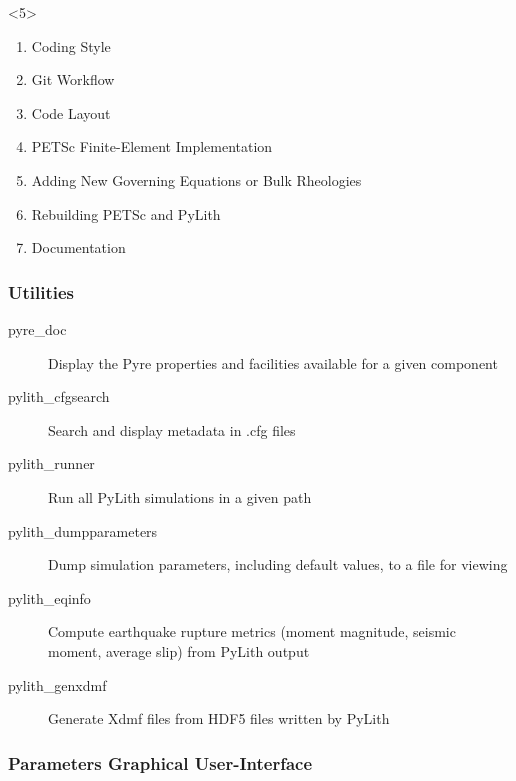 \documentclass[aspectratio=169]{beamer}
\begin{document}
\begin{frame}[t]
\begin{itemize}
\begin{onlyenv}
\begin{itemize}
      \end{itemize}
    \end{onlyenv}
    \begin{onlyenv}<5>
      \begin{enumerate}
      \item Coding Style
      \item Git Workflow
      \item Code Layout
      \item PETSc Finite-Element Implementation
      \item Adding New Governing Equations or Bulk Rheologies
      \item Rebuilding PETSc and PyLith
      \item Documentation
      \end{enumerate}
    \end{onlyenv}
  \end{itemize}

\end{frame}


\begin{frame}
  \frametitle{Utilities}

  \begin{description}
  \item[pyre\_doc] Display the Pyre properties and facilities available for a given component
  \item[pylith\_cfgsearch] Search and display metadata in .cfg files
  \item[pylith\_runner] Run all PyLith simulations in a given path
  \item[pylith\_dumpparameters] Dump simulation parameters, including default values, to a file for viewing
  \item[pylith\_eqinfo] Compute earthquake rupture metrics (moment magnitude, seismic moment, average slip) from PyLith output
  \item[pylith\_genxdmf] Generate Xdmf files from HDF5 files written by PyLith
  \end{description}  
  
\end{frame}


\begin{frame}
  \frametitle{Parameters Graphical User-Interface}


\end{frame}
\end{document}
